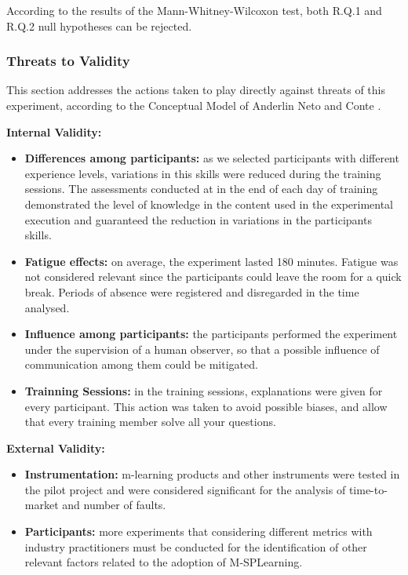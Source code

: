 According to the results of the Mann-Whitney-Wilcoxon test, both R.Q.1 and R.Q.2 null hypotheses can be rejected.

\subsubsection{Threats to Validity}\label{sec:threats}

This section addresses the actions taken to play directly against threats of this experiment, according to the Conceptual Model of Anderlin Neto and Conte \cite{neto13}.

\textbf{Internal Validity:}

\begin{itemize}
\item \textbf{Differences among participants:} as we selected participants with different experience levels, variations in this skills were reduced during the training sessions. The assessments conducted at in the end of each day of training demonstrated the level of knowledge in the content used in the experimental execution and guaranteed the reduction in variations in the participants skills.

\item \textbf{Fatigue effects:} on average, the experiment lasted 180 minutes. Fatigue was not considered relevant since the participants could leave the room for a quick break. Periods of absence were registered and disregarded in the time analysed.

\item \textbf{Influence among participants:} the participants performed the experiment under the supervision of a human observer, so that a possible influence of communication among them could be mitigated.

\item \textbf{Trainning Sessions:} in the training sessions, explanations were given for every participant. This action was taken to avoid possible biases, and allow that every training member solve all your questions.
\end{itemize}

\textbf{External Validity:}

\begin{itemize}

\item \textbf{Instrumentation:} m-learning products and other instruments were tested in the pilot project and were considered significant for the analysis of time-to-market and number of faults.

\item \textbf{Participants:} more experiments that considering different metrics with industry practitioners must be conducted for the identification of other relevant factors related to the adoption of M-SPLearning.

\end{itemize}

